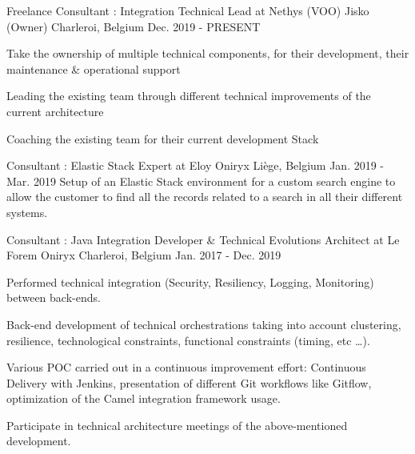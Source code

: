 

\begin{cventries}

  \cventry
    {Freelance Consultant : Integration Technical Lead at Nethys (VOO)} %
    {Jisko (Owner)} %
    {Charleroi, Belgium} %
    {Dec. 2019 - PRESENT} %
    {
      \begin{cvitems} %
        \item {Take the ownership of multiple technical components, for their development, their maintenance \& operational support}
        \item {Leading the existing team through different technical improvements of the current architecture}
        \item {Coaching the existing team for their current development Stack}
      \end{cvitems}
  }

  \cventry
    {Consultant : Elastic Stack Expert at Eloy} %
    {Oniryx} %
    {Liège, Belgium} %
    {Jan. 2019 - Mar. 2019} %
    {
      Setup of an Elastic Stack environment for a custom search engine to allow the customer to find all the records related to a search in all their different systems.
    }

\cventry
  {Consultant : Java Integration Developer \& Technical Evolutions Architect at Le Forem} %
  {Oniryx} %
  {Charleroi, Belgium} %
  {Jan. 2017 - Dec. 2019} %
  {
    \begin{cvitems} %
      \item {Performed technical integration (Security, Resiliency, Logging, Monitoring) between back-ends.}
      \item {Back-end development of technical orchestrations taking into account clustering, resilience, technological constraints, functional constraints (timing, etc \dots).}
      \item {Various POC carried out in a continuous improvement effort: Continuous Delivery with Jenkins, presentation of different Git workflows like Gitflow, optimization of the Camel integration framework usage.}
      \item {Participate in technical architecture meetings of the above-mentioned development.}
    \end{cvitems}
  }


\end{cventries}

